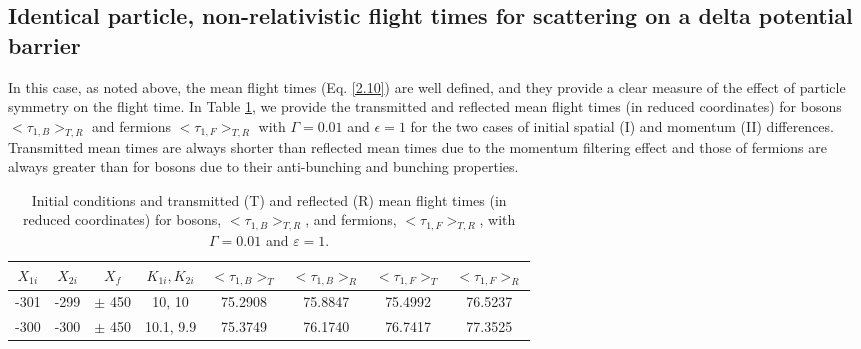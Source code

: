 \documentclass[preprint,aps]{revtex4}
\begin{document}
\subsection{Identical particle, non-relativistic flight times for scattering on a delta potential barrier} 

In this case, as noted above, the mean flight times (Eq. \ref{2.10}) are well defined, and they provide a clear measure of the effect of particle symmetry on the flight time. 
In Table \ref{table1}, we provide the transmitted and reflected mean flight times (in reduced coordinates) for bosons $<\tau_{1,B}>_{T,R}$ and 
fermions $<\tau_{1,F}>_{T,R}$ with $\Gamma=0.01$ and $\epsilon=1$ for the two cases of initial spatial (I) and momentum (II) differences. Transmitted mean times 
are always shorter than reflected mean times due to the momentum filtering effect and those of  fermions are always greater than for bosons due to their anti-bunching
and bunching properties. 

\begin{table}
	\caption{Initial conditions  and transmitted (T) and reflected (R) mean flight times (in reduced coordinates) for bosons, $<\tau_{1,B}>_{T,R}$, and fermions, $<\tau_{1,F}>_{T,R}$, with $\Gamma=0.01$ and $\varepsilon=1$.} %
	\begin{tabular}{||c|c|c|c||c|c||c|c||}
		\hline       $X_{1i}$& $X_{2i}$ & $X_f$ & $K_{1i}, K_{2i}$  & $<\tau_{1,B}>_T$ &  $<\tau_{1,B}>_R $  & $<\tau_{1,F}>_T$ &  $<\tau_{1,F}>_R $ \\
		\hline    -301 &  -299 & $\pm$ 450 & 10, 10 &75.2908 & 75.8847  & 75.4992  & 76.5237 \\
		\hline     -300 &  -300& $\pm$ 450 & 10.1, 9.9 &75.3749 & 76.1740 & 76.7417  &77.3525  \\
		\hline
		\hline 
	\end{tabular}
	\label{table1}
\end{table}
%
\end{document}
